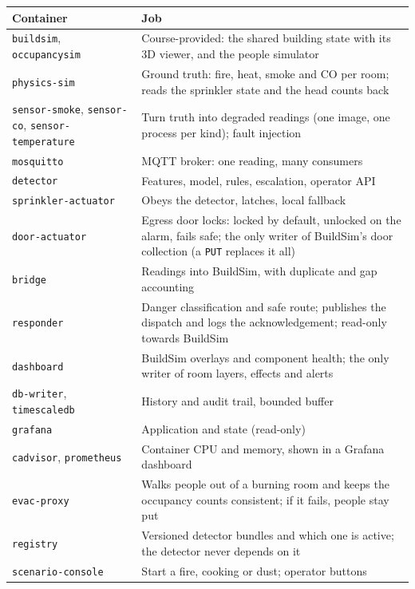 \documentclass[11pt]{article}
\newcommand{\code}[1]{\texttt{#1}}
\begin{document}
\begin{longtable}{@{}L{5.4cm}L{10.2cm}@{}}
\toprule
Container & Job\\
\midrule\endhead
\code{buildsim}, \code{occupancysim} & Course-provided: the shared building state with its 3D viewer, and the people simulator\\
\code{physics-sim} & Ground truth: fire, heat, smoke and CO per room; reads the sprinkler state and the head counts back\\
\code{sensor-smoke}, \code{sensor-co}, \code{sensor-temperature} & Turn truth into degraded readings (one image, one process per kind); fault injection\\
\code{mosquitto} & MQTT broker: one reading, many consumers\\
\code{detector} & Features, model, rules, escalation, operator API\\
\code{sprinkler-actuator} & Obeys the detector, latches, local fallback\\
\code{door-actuator} & Egress door locks: locked by default, unlocked on the alarm, fails safe; the only writer of BuildSim's door collection (a \code{PUT} replaces it all)\\
\code{bridge} & Readings into BuildSim, with duplicate and gap accounting\\
\code{responder} & Danger classification and safe route; publishes the dispatch and logs the acknowledgement; read-only towards BuildSim\\
\code{dashboard} & BuildSim overlays and component health; the only writer of room layers, effects and alerts\\
\code{db-writer}, \code{timescaledb} & History and audit trail, bounded buffer\\
\code{grafana} & Application and state (read-only)\\
\code{cadvisor}, \code{prometheus} & Container CPU and memory, shown in a Grafana dashboard\\
\code{evac-proxy} & Walks people out of a burning room and keeps the occupancy counts consistent; if it fails, people stay put\\
\code{registry} & Versioned detector bundles and which one is active; the detector never depends on it\\
\code{scenario-console} & Start a fire, cooking or dust; operator buttons\\
\bottomrule
\end{longtable}
\end{document}
